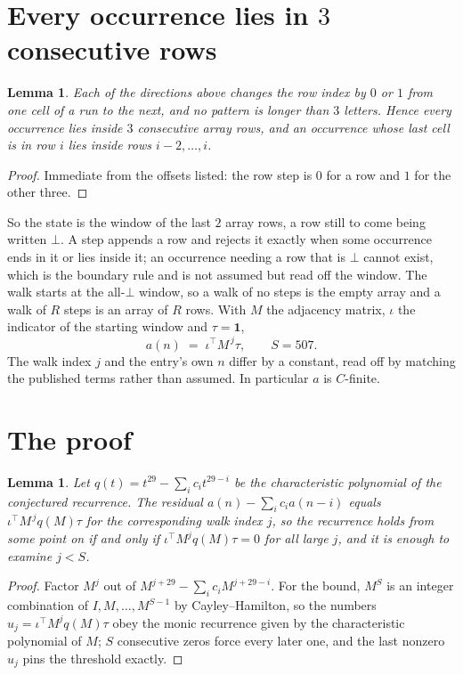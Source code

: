 \documentclass[11pt,a4paper]{article}
\theoremstyle{plain}
\newtheorem{lemma}[theorem]{Lemma}
\theoremstyle{definition}
\begin{document}
\section{Every occurrence lies in $3$ consecutive rows}

\begin{lemma}\label{lem:win}
Each of the directions above changes the row index by $0$ or $1$ from one cell of a run to the
next, and no pattern is longer than $3$ letters. Hence every occurrence lies inside $3$
consecutive array rows, and an occurrence whose last cell is in row $i$ lies inside rows
$i-2,\dots,i$.
\end{lemma}

\begin{proof}
Immediate from the offsets listed: the row step is $0$ for a row and $1$ for the other three.
\end{proof}

So the state is the window of the last $2$ array rows, a row still to come being written
$\bot$. A step appends a row and rejects it exactly when some occurrence ends in it or lies
inside it; an occurrence needing a row that is $\bot$ cannot exist, which is the boundary rule
and is not assumed but read off the window. The walk starts at the all-$\bot$ window, so a walk
of no steps is the empty array and a walk of $R$ steps is an array of $R$ rows. With $M$ the
adjacency matrix, $\iota$ the indicator of the starting window and $\tau=\mathbf{1}$,
\[
a(n)\;=\;\iota^{\!\top}M^{\,j}\tau ,\qquad S=507.
\]
The walk index $j$ and the entry's own $n$ differ by a constant, read off by matching the
published terms rather than assumed. In particular $a$ is $C$-finite.

\section{The proof}

\begin{lemma}\label{lem:crit}
Let $q(t)=t^{29}-\sum_i c_it^{29-i}$ be the characteristic polynomial of the
conjectured recurrence. The residual $a(n)-\sum_ic_ia(n-i)$ equals
$\iota^{\!\top}M^{\,j}q(M)\tau$ for the corresponding walk index $j$, so the recurrence
holds from some point on if and only if $\iota^{\!\top}M^{j}q(M)\tau=0$ for all large $j$,
and it is enough to examine $j<S$.
\end{lemma}

\begin{proof}
Factor $M^{j}$ out of $M^{j+29}-\sum_ic_iM^{j+29-i}$. For the bound, $M^{S}$
is an integer combination of $I,M,\dots,M^{S-1}$ by Cayley--Hamilton, so the numbers
$u_j=\iota^{\!\top}M^{j}q(M)\tau$ obey the monic recurrence given by the characteristic
polynomial of $M$; $S$ consecutive zeros force every later one, and the last nonzero $u_j$
pins the threshold exactly.
\end{proof}
\end{document}
